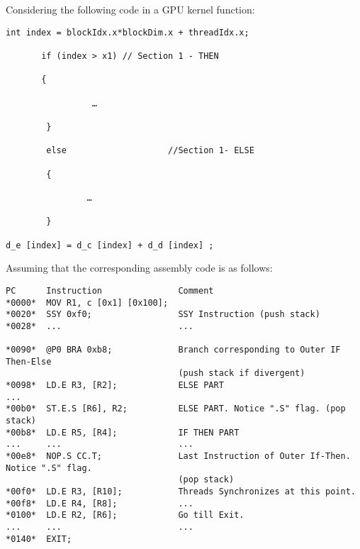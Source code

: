 \documentclass[11pt]{article}
\begin{document}
\section{}

Considering the following code in a GPU kernel function:

\begin{verbatim}
int index = blockIdx.x*blockDim.x + threadIdx.x;

       if (index > x1) // Section 1 - THEN

       {   

                 …  

        }

        else                    //Section 1- ELSE

        {

                …

        }              

d_e [index] = d_c [index] + d_d [index] ;
\end{verbatim}

Assuming that the corresponding assembly code is as follows:

\begin{verbatim}
PC      Instruction               Comment
*0000*  MOV R1, c [0x1] [0x100];
*0020*  SSY 0xf0;                 SSY Instruction (push stack)
*0028*  ...                       ...
                                    
*0090*  @P0 BRA 0xb8;             Branch corresponding to Outer IF Then-Else 
                                  (push stack if divergent)
*0098*  LD.E R3, [R2];            ELSE PART
...
*00b0*  ST.E.S [R6], R2;          ELSE PART. Notice ".S" flag. (pop stack)
*00b8*  LD.E R5, [R4];            IF THEN PART
...     ...                       ...
*00e8*  NOP.S CC.T;               Last Instruction of Outer If-Then. Notice ".S" flag. 
                                  (pop stack)
*00f0*  LD.E R3, [R10];           Threads Synchronizes at this point.
*00f8*  LD.E R4, [R8];            ...
*0100*  LD.E R2, [R6];            Go till Exit.
...     ...                       ...
*0140*  EXIT;
\end{verbatim}


\begin{Answer}
\end{Answer}

\newpage
\end{document}
